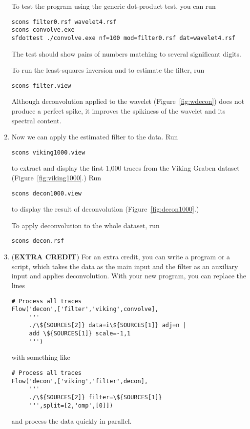 \begin{enumerate}
To test the program using the generic dot-product test, you can run
\begin{verbatim}
scons filter0.rsf wavelet4.rsf
scons convolve.exe
sfdottest ./convolve.exe nf=100 mod=filter0.rsf dat=wavelet4.rsf
\end{verbatim}
The test should show pairs of numbers matching to several significant digits.

To run the least-squares inversion and to estimate the filter, run
\begin{verbatim}
scons filter.view
\end{verbatim}


Although deconvolution applied to the wavelet
(Figure~\ref{fig:wdecon}) does not produce a perfect spike, it
improves the spikiness of the wavelet and its spectral content.

\item Now we can apply the estimated filter to the data. Run
\begin{verbatim}
scons viking1000.view
\end{verbatim}
to extract and display the first 1,000 traces from the Viking Graben
dataset (Figure~\ref{fig:viking1000}.) Run
\begin{verbatim}
scons decon1000.view
\end{verbatim}
to display the result of deconvolution (Figure~\ref{fig:decon1000}.)



To apply deconvolution to the whole dataset, run
\begin{verbatim}
scons decon.rsf
\end{verbatim}

\item (\textbf{EXTRA CREDIT}) For an extra credit, you can write a program or a script, which takes the data as the main input and the filter as an auxiliary input and applies deconvolution. With your new program, you can replace the lines
\lstset{language=python,numbers=left,numberstyle=\tiny,showstringspaces=false}
\begin{lstlisting}
# Process all traces
Flow('decon',['filter','viking',convolve],
     '''
     ./\${SOURCES[2]} data=i\${SOURCES[1]} adj=n | 
     add \${SOURCES[1]} scale=-1,1
     ''')
\end{lstlisting}
with something like
\begin{lstlisting}
# Process all traces
Flow('decon',['viking','filter',decon],
     '''
     ./\${SOURCES[2]} filter=\${SOURCES[1]}  
     ''',split=[2,'omp',[0]])
\end{lstlisting}
and process the data quickly in parallel.


\end{enumerate}
